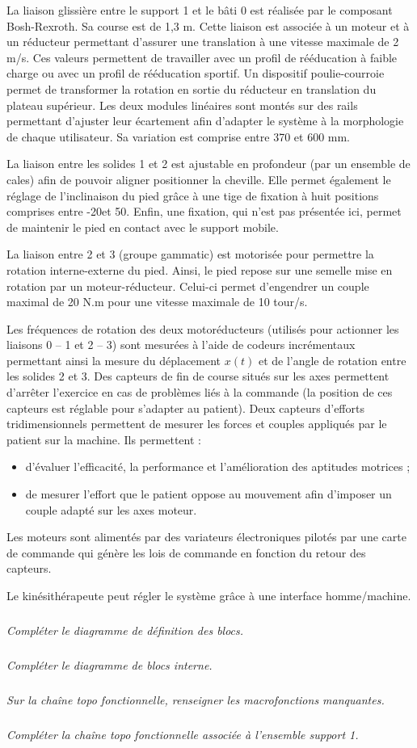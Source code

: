 \documentclass[10pt]{article}
\begin{document}
La liaison glissière entre le support 1 et le bâti 0 est réalisée par le composant Bosh-Rexroth. Sa course est de 1,3 m. Cette liaison est associée à un moteur et à un réducteur permettant d’assurer une translation à une vitesse maximale de 2 m/s. Ces valeurs permettent de travailler avec un profil de rééducation à faible charge ou avec un profil de rééducation sportif. Un dispositif poulie-courroie permet de transformer la rotation en sortie du réducteur en translation du plateau supérieur. Les deux modules linéaires sont montés sur des rails permettant d’ajuster leur écartement afin d’adapter le système à la morphologie de chaque utilisateur. Sa variation est comprise entre 370 et 600 mm.

La liaison entre les solides 1 et 2 est ajustable en profondeur (par un ensemble de cales) afin de pouvoir aligner positionner la cheville. Elle permet également le réglage de l’inclinaison du pied grâce à une tige de fixation à huit positions comprises entre -20\textdegree et 50\textdegree. Enfin, une fixation, qui n’est pas présentée ici, permet de maintenir le pied en contact avec le support mobile.

La liaison entre 2 et 3 (groupe gammatic) est motorisée pour permettre la rotation interne-externe du pied. Ainsi, le pied repose sur une semelle mise en rotation par un moteur-réducteur. Celui-ci permet d’engendrer un couple maximal de 20 N.m pour une vitesse maximale de 10 tour/s. 

Les fréquences de rotation des deux motoréducteurs (utilisés pour actionner les liaisons 0 – 1 et 2 – 3) sont mesurées à l'aide de codeurs incrémentaux permettant ainsi la mesure du déplacement $x(t)$ et de l’angle de rotation entre les solides 2 et 3. Des capteurs de fin de course situés sur les axes permettent d'arrêter l'exercice en cas de problèmes liés à la commande (la position de ces capteurs est réglable pour s'adapter au patient). Deux capteurs d'efforts tridimensionnels permettent de mesurer les forces et couples appliqués par le patient sur la machine. Ils permettent :
\begin{itemize}
\item d'évaluer l'efficacité, la performance et l'amélioration des aptitudes motrices ;
\item de mesurer l'effort que le patient oppose au mouvement afin d'imposer un couple adapté sur les axes moteur.
\end{itemize}
Les moteurs sont alimentés par des variateurs électroniques pilotés par une carte de commande qui génère les lois de commande en fonction du retour des capteurs.

Le kinésithérapeute peut régler le système grâce à une interface homme/machine.



\subparagraph{}
\textit{Compléter le diagramme de définition des blocs.}

\subparagraph{}
\textit{Compléter le diagramme de blocs interne.}

\subparagraph{}
\textit{Sur la chaîne topo fonctionnelle, renseigner les macrofonctions manquantes.}

\subparagraph{}
\textit{Compléter la chaîne topo fonctionnelle associée à l’ensemble support 1.}
\end{document}
